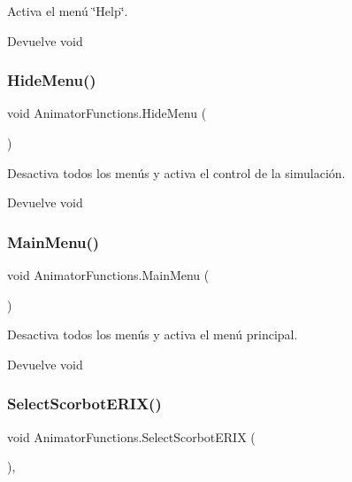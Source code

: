 Activa el menú \char`\"{}\+Help\char`\"{}. \begin{DoxyReturn}{Devuelve}
void 
\end{DoxyReturn}
\mbox{\label{class_animator_functions_a70a35e4c8e707f3ac7a9797173c38065}} 
\subsubsection{\texorpdfstring{HideMenu()}{HideMenu()}}
{\footnotesize\ttfamily void Animator\+Functions.\+Hide\+Menu (\begin{DoxyParamCaption}{ }\end{DoxyParamCaption})\hspace{0.3cm}{\ttfamily [inline]}}

Desactiva todos los menús y activa el control de la simulación. \begin{DoxyReturn}{Devuelve}
void 
\end{DoxyReturn}
\mbox{\label{class_animator_functions_a414db2e5825d7eeb07f8c1bc12b752eb}} 
\subsubsection{\texorpdfstring{MainMenu()}{MainMenu()}}
{\footnotesize\ttfamily void Animator\+Functions.\+Main\+Menu (\begin{DoxyParamCaption}{ }\end{DoxyParamCaption})\hspace{0.3cm}{\ttfamily [inline]}}

Desactiva todos los menús y activa el menú principal. \begin{DoxyReturn}{Devuelve}
void 
\end{DoxyReturn}
\mbox{\label{class_animator_functions_ae71b52412fec20a452c8a617a12614c6}} 
\subsubsection{\texorpdfstring{SelectScorbotERIX()}{SelectScorbotERIX()}}
{\footnotesize\ttfamily void Animator\+Functions.\+Select\+Scorbot\+E\+R\+IX (\begin{DoxyParamCaption}{ }\end{DoxyParamCaption})\hspace{0.3cm}{\ttfamily [inline]}, {\ttfamily [private]}}

